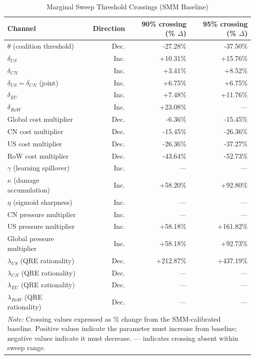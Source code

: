 \begin{table}[htbp]
\centering
\small
\caption{Marginal Sweep Threshold Crossings (SMM Baseline)}
\label{tab:sweep_crossings}
\begin{tabular}{lrrr}
\toprule
\textbf{Channel} & \textbf{Direction} & \textbf{90\% crossing (\% $\Delta$)} & \textbf{95\% crossing (\% $\Delta$)} \\
\midrule
$\theta$ (coalition threshold) & Dec. & -27.28\% & -37.50\% \\
$\delta_{US}$ & Inc. & +10.31\% & +15.76\% \\
$\delta_{CN}$ & Inc. & +3.41\% & +8.52\% \\
$\delta_{US}=\delta_{CN}$ (joint) & Inc. & +6.75\% & +6.75\% \\
$\delta_{EU}$ & Inc. & +7.48\% & +11.76\% \\
$\delta_{RoW}$ & Inc. & +23.08\% & --- \\
Global cost multiplier & Dec. & -6.36\% & -15.45\% \\
CN cost multiplier & Dec. & -15.45\% & -26.36\% \\
US cost multiplier & Dec. & -26.36\% & -37.27\% \\
RoW cost multiplier & Dec. & -43.64\% & -52.73\% \\
$\gamma$ (learning spillover) & Inc. & --- & --- \\
$\kappa$ (damage accumulation) & Inc. & +58.20\% & +92.80\% \\
$\eta$ (sigmoid sharpness) & Inc. & --- & --- \\
CN pressure multiplier & Inc. & --- & --- \\
US pressure multiplier & Inc. & +58.18\% & +161.82\% \\
Global pressure multiplier & Inc. & +58.18\% & +92.73\% \\
$\lambda_{US}$ (QRE rationality) & Dec. & +212.87\% & +437.19\% \\
$\lambda_{CN}$ (QRE rationality) & Dec. & --- & --- \\
$\lambda_{EU}$ (QRE rationality) & Dec. & --- & --- \\
$\lambda_{RoW}$ (QRE rationality) & Dec. & --- & --- \\
\bottomrule
\multicolumn{4}{p{14cm}}{\footnotesize \textit{Note:} Crossing values expressed as \% change from the SMM-calibrated baseline. Positive values indicate the parameter must increase from baseline; negative values indicate it must decrease. --- indicates crossing absent within sweep range.}
\\
\end{tabular}
\end{table}